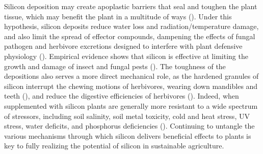 \documentclass[12pt, letterpaper, ]{article}
\begin{document}
Silicon deposition may create apoplastic barriers that seal and toughen the plant tissue, which may benefit the plant in a multitude of ways (\cite{coskun_controversies_2019}). Under this hypothesis, silicon deposits reduce water loss and radiation/temperature damage, and also limit the spread of effector compounds, dampening the effects of fungal pathogen and herbivore excretions designed to interfere with plant defensive physiology (\cite{coskun_controversies_2019}). Empirical evidence shows that silicon is effective at limiting the growth and damage of insect and fungal pests (\cite{fauteux_silicon_2005,massey_herbivore_2007}). The toughness of the depositions also serves a more direct mechanical role, as the hardened granules of silicon interrupt the chewing motions of herbivores, wearing down mandibles and teeth (\cite{stromberg_functions_2016,waterman_short-term_2021-1}), and reduce the digestive efficiencies of herbivores (\cite{johnson_silicon_2021}). Indeed, when supplemented with silicon plants are generally more resistant to a wide spectrum of stressors, including soil salinity, soil metal toxicity, cold and heat stress, UV stress, water deficits, and phosphorus deficiencies (\cite{cooke_consistent_2016}). Continuing to untangle the various mechanisms through which silicon delivers beneficial effects to plants is key to fully realizing the potential of silicon in sustainable agriculture.
\end{document}
